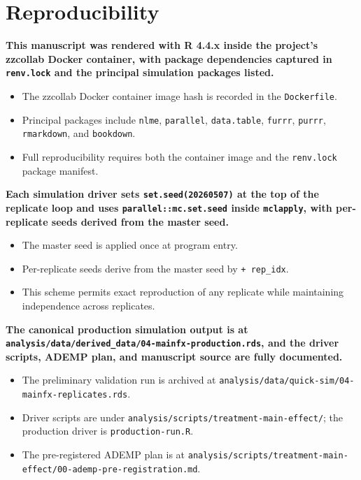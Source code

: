\documentclass[
  11pt,
]{article}
\begin{document}
\section{Reproducibility}\label{reproducibility}

\textbf{This manuscript was rendered with R 4.4.x inside the project's zzcollab Docker container, with package dependencies captured in \texttt{renv.lock} and the principal simulation packages listed.}

\begin{itemize}\setlength{\itemsep}{2pt}\setlength{\parskip}{0pt}
\item The zzcollab Docker container image hash is recorded in the \texttt{Dockerfile}.
\item Principal packages include \texttt{nlme}, \texttt{parallel}, \texttt{data.table}, \texttt{furrr}, \texttt{purrr}, \texttt{rmarkdown}, and \texttt{bookdown}.
\item Full reproducibility requires both the container image and the \texttt{renv.lock} package manifest.
\end{itemize}

\textbf{Each simulation driver sets \texttt{set.seed(20260507)} at the top of the replicate loop and uses \texttt{parallel::mc.set.seed} inside \texttt{mclapply}, with per-replicate seeds derived from the master seed.}

\begin{itemize}\setlength{\itemsep}{2pt}\setlength{\parskip}{0pt}
\item The master seed is applied once at program entry.
\item Per-replicate seeds derive from the master seed by \texttt{+ rep\_idx}.
\item This scheme permits exact reproduction of any replicate while maintaining independence across replicates.
\end{itemize}

\textbf{The canonical production simulation output is at \texttt{analysis/data/derived\_data/04-mainfx-production.rds}, and the driver scripts, ADEMP plan, and manuscript source are fully documented.}

\begin{itemize}\setlength{\itemsep}{2pt}\setlength{\parskip}{0pt}
\item The preliminary validation run is archived at \texttt{analysis/data/quick-sim/04-mainfx-replicates.rds}.
\item Driver scripts are under \texttt{analysis/scripts/treatment-main-effect/}; the production driver is \texttt{production-run.R}.
\item The pre-registered ADEMP plan is at \texttt{analysis/scripts/treatment-main-effect/00-ademp-pre-registration.md}.
\end{itemize}
\end{document}

